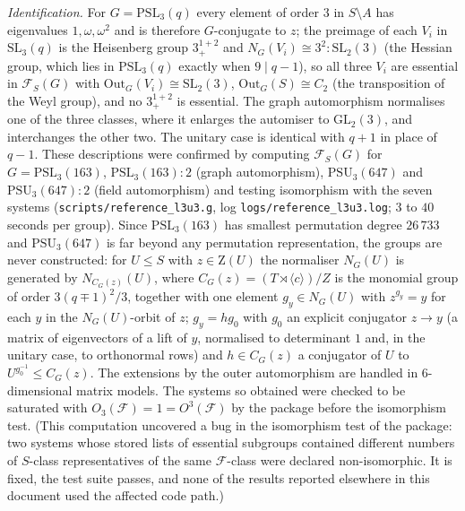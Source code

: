 \documentclass[11pt]{article}
\theoremstyle{definition}
\theoremstyle{remark}
\newcommand{\F}{\mathcal{F}}
\newcommand{\Out}{\mathrm{Out}}
\newcommand{\GL}{\mathrm{GL}}
\newcommand{\SL}{\mathrm{SL}}
\newcommand{\PSL}{\mathrm{PSL}}
\newcommand{\PSU}{\mathrm{PSU}}
\newcommand{\Z}{\mathrm{Z}}
\begin{document}
\emph{Identification.}  For $G=\PSL_3(q)$ every element of order $3$ in
$S\setminus A$ has eigenvalues $1,\omega,\omega^2$ and is therefore
$G$-conjugate to $z$; the preimage of each $V_i$ in $\SL_3(q)$ is the
Heisenberg group $3^{1+2}_+$ and $N_G(V_i)\cong 3^2{:}\SL_2(3)$ (the Hessian
group, which lies in $\PSL_3(q)$ exactly when $9\mid q-1$), so all three
$V_i$ are essential in $\F_S(G)$ with $\Out_G(V_i)\cong\SL_2(3)$,
$\Out_G(S)\cong C_2$ (the transposition of the Weyl group), and no
$3^{1+2}_+$ is essential.  The graph automorphism normalises one of the three
classes, where it enlarges the automiser to $\GL_2(3)$, and interchanges
the other two.  The unitary case is identical with $q+1$ in place of $q-1$.
These descriptions were confirmed by computing $\F_S(G)$ for
$G=\PSL_3(163)$, $\PSL_3(163){:}2$ (graph automorphism), $\PSU_3(647)$ and
$\PSU_3(647){:}2$ (field automorphism) and testing isomorphism with the
seven systems (\texttt{scripts/reference\_l3u3.g}, log
\texttt{logs/reference\_l3u3.log}; $3$ to $40$ seconds per group).  Since
$\PSL_3(163)$ has smallest permutation degree $26\,733$ and $\PSU_3(647)$ is
far beyond any permutation representation, the groups are never
constructed: for $U\le S$ with $z\in\Z(U)$ the normaliser $N_G(U)$ is
generated by $N_{C_G(z)}(U)$, where $C_G(z)=(T\rtimes\langle c\rangle)/Z$ is
the monomial group of order $3(q\mp1)^2/3$, together with one element
$g_y\in N_G(U)$ with $z^{g_y}=y$ for each $y$ in the $N_G(U)$-orbit of $z$;
$g_y=hg_0$ with $g_0$ an explicit conjugator $z\to y$ (a matrix of
eigenvectors of a lift of $y$, normalised to determinant $1$ and, in the
unitary case, to orthonormal rows) and $h\in C_G(z)$ a conjugator of $U$ to
$U^{g_0^{-1}}\le C_G(z)$.  The extensions by the outer automorphism are
handled in $6$-dimensional matrix models.  The systems so obtained were
checked to be saturated with $O_3(\F)=1=O^3(\F)$ by the package before the
isomorphism test.  (This computation uncovered a bug in the isomorphism
test of the package: two systems whose stored lists of essential subgroups
contained different numbers of $S$-class representatives of the same
$\F$-class were declared non-isomorphic.  It is fixed, the test suite
passes, and none of the results reported elsewhere in this document used
the affected code path.)
\end{document}
